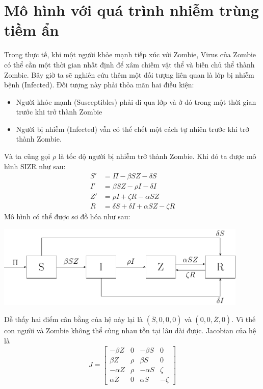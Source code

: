 \documentclass[12pt]{scrartcl}
\begin{document}
\section{Mô hình với quá trình nhiễm trùng tiềm ẩn}
 Trong thực tế, khi một người khỏe mạnh tiếp xúc với Zombie, Virus của Zombie có thể cần một thời gian nhất định để xâm chiếm vật thể và biến chủ thể thành Zombie. Bây giờ ta sẽ nghiên cứu thêm một đối tượng liên quan là lớp bị nhiễm bệnh (Infected). Đối tượng này phải thỏa mãn hai điều kiện:
 \begin{itemize}
    \item Người khỏe mạnh (Susceptibles) phải đi qua lớp và ở đó trong một thời gian trước khi trở thành Zombie
    \item Người bị nhiễm (Infected) vẫn có thể chết một cách tự nhiên trước khi trở thành Zombie.
 \end{itemize}
Và ta cũng gọi $\rho$ là tốc độ người bị nhiễm trở thành Zombie. Khi đó ta được mô hình SIZR như sau:
\[
 \begin{aligned}
    S' &= \Pi - \beta S Z - \delta S\\
    I' &= \beta S Z - \rho I - \delta I\\
    Z' &= \rho I + \zeta R - \alpha S Z\\
    R &= \delta S + \delta I + \alpha S Z - \zeta R
 \end{aligned}
\]
Mô hình có thể được sơ đồ hóa như sau:
\begin{center}
    \includegraphics[width=0.9\textwidth]{SIZR.pdf}
\end{center}
Dễ thấy hai điểm cân bằng của hệ này lại là $(\overline{S},0,0,0)$ và $(0,0,\overline{Z},0)$. Vì thế con người và Zombie không thể cùng nhau tồn tại lâu dài được. Jacobian của hệ là 
\[
    J = \begin{bmatrix}
        -\beta Z & 0 & -\beta S & 0\\
        \beta Z & \rho & \beta S & 0\\
        -\alpha Z & \rho & -\alpha S & \zeta \\
        \alpha Z & 0 & \alpha S & -\zeta
    \end{bmatrix}
\]
\end{document}
